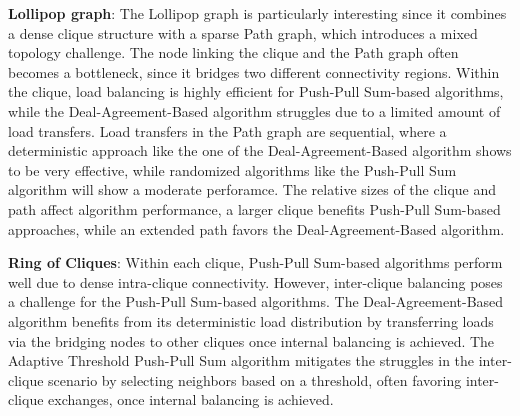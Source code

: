 \textbf{Lollipop graph}: The Lollipop graph is particularly interesting since it combines a dense clique structure with a sparse Path graph, which introduces a mixed topology challenge. The node linking the clique and the Path graph often becomes a bottleneck, since it bridges two different connectivity regions. Within the clique, load balancing is highly efficient for Push-Pull Sum-based algorithms, while the Deal-Agreement-Based algorithm struggles due to a limited amount of load transfers. Load transfers in the Path graph are sequential, where a deterministic approach like the one of the Deal-Agreement-Based algorithm shows to be very effective, while randomized algorithms like the Push-Pull Sum algorithm will show a moderate perforamce. The relative sizes of the clique and path affect algorithm performance, a larger clique benefits Push-Pull Sum-based approaches, while an extended path favors the Deal-Agreement-Based algorithm.

\textbf{Ring of Cliques}: Within each clique, Push-Pull Sum-based algorithms perform well due to dense intra-clique connectivity. However, inter-clique balancing poses a challenge for the Push-Pull Sum-based algorithms. The Deal-Agreement-Based algorithm benefits from its deterministic load distribution by transferring loads via the bridging nodes to other cliques once internal balancing is achieved. The Adaptive Threshold Push-Pull Sum algorithm mitigates the struggles in the inter-clique scenario by selecting neighbors based on a threshold, often favoring inter-clique exchanges, once internal balancing is achieved. 
